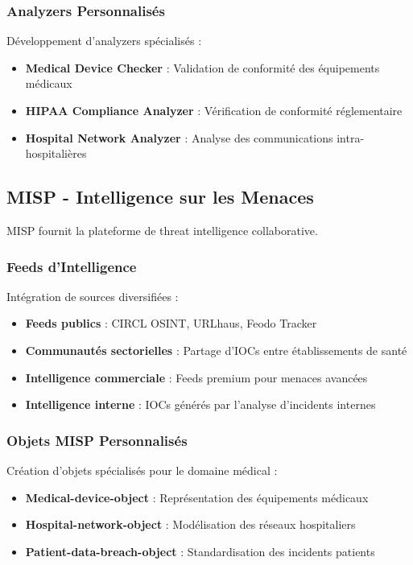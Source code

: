 \subsubsection{Analyzers Personnalisés}
Développement d'analyzers spécialisés :
\begin{itemize}
    \item \textbf{Medical Device Checker} : Validation de conformité des équipements médicaux
    \item \textbf{HIPAA Compliance Analyzer} : Vérification de conformité réglementaire
    \item \textbf{Hospital Network Analyzer} : Analyse des communications intra-hospitalières
\end{itemize}

\subsection{MISP - Intelligence sur les Menaces}

MISP fournit la plateforme de threat intelligence collaborative.

\subsubsection{Feeds d'Intelligence}
Intégration de sources diversifiées :
\begin{itemize}
    \item \textbf{Feeds publics} : CIRCL OSINT, URLhaus, Feodo Tracker
    \item \textbf{Communautés sectorielles} : Partage d'IOCs entre établissements de santé
    \item \textbf{Intelligence commerciale} : Feeds premium pour menaces avancées
    \item \textbf{Intelligence interne} : IOCs générés par l'analyse d'incidents internes
\end{itemize}

\subsubsection{Objets MISP Personnalisés}
Création d'objets spécialisés pour le domaine médical :
\begin{itemize}
    \item \textbf{Medical-device-object} : Représentation des équipements médicaux
    \item \textbf{Hospital-network-object} : Modélisation des réseaux hospitaliers
    \item \textbf{Patient-data-breach-object} : Standardisation des incidents patients
\end{itemize}


